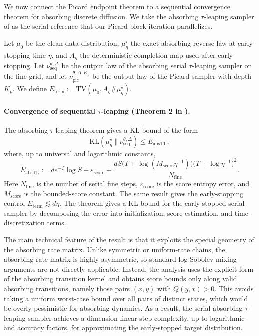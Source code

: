 \documentclass{article}
\newcommand{\TV}{\mathrm{TV}}
\begin{document}
We now connect the Picard endpoint theorem to a sequential convergence theorem for absorbing discrete diffusion.  We take the absorbing $\tau$-leaping sampler of \citep{liangabsorb} as the serial reference that our Picard block iteration parallelizes.

Let $\mu_0$ be the clean data distribution, $\mu_\eta^\star$ the exact absorbing reverse law at early stopping time $\eta$, and $A_\eta$ the deterministic completion map used after early stopping.  Let $\nu_{\mathrm{seq}}^{\theta,\Delta}$ be the output law of the absorbing serial $\tau$-leaping sampler on the fine grid, and let $\nu_{\mathrm{pic}}^{\theta,\Delta,K_p}$ be the output law of the Picard sampler with depth $K_p$.  We define $E_{\mathrm{term}}:=\TV(\mu_0,A_\eta\#\mu_\eta^\star)$.

\paragraph{Convergence of sequential $\tau$-leaping (Theorem 2 in  \citep{liangabsorb}).}
The absorbing $\tau$-leaping theorem gives a KL bound of the form
\[
\mathrm{KL}(\mu_\eta^\star\|\nu_{\mathrm{seq}}^{\theta,\Delta})
\le E_{\mathrm{absTL}},
\]
where, up to universal and logarithmic constants,
\[
E_{\mathrm{absTL}}
:=
 d  e^{-T} \log S
 +\varepsilon_{\mathrm{score}}
 +
 \frac{dS\bigl(T+\log(M_{\mathrm{score}}\eta^{-1})\bigr)
          \bigl(T+\log \eta^{-1}\bigr)^2}
        {N_{\mathrm{fine}}}.
\]
Here $N_{\mathrm{fine}}$ is the number of serial fine steps, $\varepsilon_{\mathrm{score}}$ is the score entropy error, and $M_{\mathrm{score}}$ is the bounded-score constant.  The same result gives the early-stopping control $E_{\mathrm{term}}\lesssim d\eta$. The theorem gives a KL bound for the early-stopped serial sampler by decomposing the error into initialization, score-estimation, and time-discretization terms. 

The main technical feature of the result is that it exploits the special geometry of the absorbing rate matrix. Unlike symmetric or uniform-rate chains, the absorbing rate matrix is highly asymmetric, so standard log-Sobolev mixing arguments are not directly applicable. Instead, the analysis uses the explicit form of the absorbing transition kernel and obtains score bounds only along valid absorbing transitions, namely those pairs \((x,y)\) with \(Q(y,x)>0\). This avoids taking a uniform worst-case bound over all pairs of distinct states, which would be overly pessimistic for absorbing dynamics. 
As a result, the serial absorbing \(\tau\)-leaping sampler achieves a dimension-linear step complexity, up to logarithmic and accuracy factors, for approximating the early-stopped target distribution. 
\end{document}
